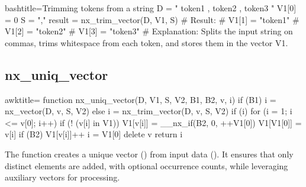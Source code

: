 \begin{NexCodeBox}{bash}{title={Trimming tokens from a string}}
	D = "  token1 ,  token2 ,  token3  "
	V1[0] = 0
	S = ","
	result = nx_trim_vector(D, V1, S)
	# Result:
	# V1[1] = "token1"
	# V1[2] = "token2"
	# V1[3] = "token3"
	# Explanation: Splits the input string on commas, trims whitespace from each token, and stores them in the vector V1.
\end{NexCodeBox}

\newpage
\subsection{nx_uniq_vector}
\label{nx_uniq_vector}
\begin{NexCodeBox}{awk}{title={}}
function nx_uniq_vector(D, V1, S, V2, B1, B2, v, i) {
	if (B1)
		i = nx_vector(D, v, S, V2)
	else
		i = nx_trim_vector(D, v, S, V2)
	if (i) {
		for (i = 1; i <= v[0]; i++) {
			if (! (v[i] in V1)) {
				V1[v[i]] = __nx_if(B2, 0, ++V1[0])
				V1[V1[0]] = v[i]
			}
			if (B2)
				V1[v[i]]++
		}
		i = V1[0]
	}
	delete v
	return i
}
\end{NexCodeBox}

\begin{NexMainBox}
	\begin{NexMainBox}
		The  function creates a unique vector () from input data (). It ensures that only distinct elements are added, with optional occurrence counts, while leveraging auxiliary vectors for processing.
	\end{NexMainBox}
	\begin{NexMainBox}
		\begin{NexListDark}
		\end{NexListDark}
	\end{NexMainBox}
\end{NexMainBox}

